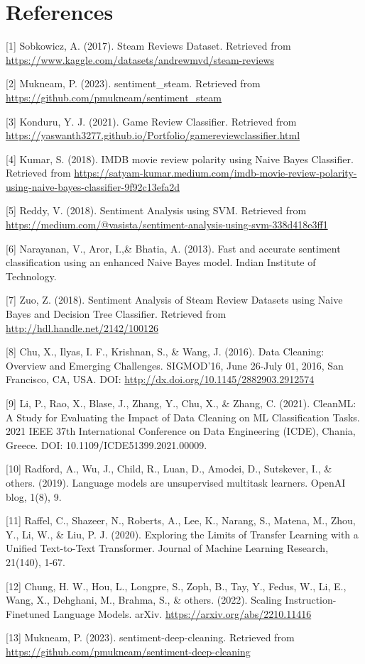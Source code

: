 \documentclass{article}
\begin{document}
\section{References}

\small

[1] Sobkowicz, A. (2017). Steam Reviews Dataset. Retrieved from \url{https://www.kaggle.com/datasets/andrewmvd/steam-reviews}

[2] Mukneam, P. (2023). sentiment\_steam. Retrieved from \url{https://github.com/pmukneam/sentiment_steam}

[3] Konduru, Y. J. (2021). Game Review Classifier. Retrieved from \url{https://yaswanth3277.github.io/Portfolio/gamereviewclassifier.html}

[4] Kumar, S. (2018). IMDB movie review polarity using Naive Bayes Classifier. Retrieved from \url{https://satyam-kumar.medium.com/imdb-movie-review-polarity-using-naive-bayes-classifier-9f92c13efa2d}

[5] Reddy, V. (2018). Sentiment Analysis using SVM. Retrieved from \url{https://medium.com/@vasista/sentiment-analysis-using-svm-338d418e3ff1}

[6] Narayanan, V., Aror, I.,\& Bhatia, A. (2013). Fast and accurate sentiment classification using an enhanced Naive Bayes model. Indian Institute of Technology.

[7] Zuo, Z. (2018). Sentiment Analysis of Steam Review Datasets using Naive Bayes and Decision Tree Classifier. Retrieved from \url{http://hdl.handle.net/2142/100126}

[8] Chu, X., Ilyas, I. F., Krishnan, S., \& Wang, J. (2016). Data Cleaning: Overview and Emerging Challenges. SIGMOD’16, June 26-July 01, 2016, San Francisco, CA, USA. DOI: \url{http://dx.doi.org/10.1145/2882903.2912574}

[9] Li, P., Rao, X., Blase, J., Zhang, Y., Chu, X., \& Zhang, C. (2021). CleanML: A Study for Evaluating the Impact of Data Cleaning on ML Classification Tasks. 2021 IEEE 37th International Conference on Data Engineering (ICDE), Chania, Greece. DOI: 10.1109/ICDE51399.2021.00009.

[10] Radford, A., Wu, J., Child, R., Luan, D., Amodei, D., Sutskever, I., \& others. (2019). Language models are unsupervised multitask learners. OpenAI blog, 1(8), 9.

[11] Raffel, C., Shazeer, N., Roberts, A., Lee, K., Narang, S., Matena, M., Zhou, Y., Li, W., \& Liu, P. J. (2020). Exploring the Limits of Transfer Learning with a Unified Text-to-Text Transformer. Journal of Machine Learning Research, 21(140), 1-67.

[12] Chung, H. W., Hou, L., Longpre, S., Zoph, B., Tay, Y., Fedus, W., Li, E., Wang, X., Dehghani, M., Brahma, S., \& others. (2022). Scaling Instruction-Finetuned Language Models. arXiv. \url{https://arxiv.org/abs/2210.11416}

[13] Mukneam, P. (2023). sentiment-deep-cleaning. Retrieved from \url{https://github.com/pmukneam/sentiment-deep-cleaning}
\end{document}
